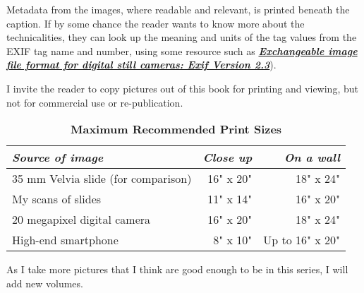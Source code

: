 Metadata from the images, where readable and relevant, is printed beneath the caption. If by some chance the reader wants to know more about the technicalities, they can look up the meaning and units of the tag values from the EXIF tag name and number, using some resource such as \href{https://www.cipa.jp/std/documents/e/DC-008-2012_E.pdf}{\emph{\textbf{Exchangeable image file format for digital still cameras: Exif Version 2.3}}}).

I invite the reader to copy pictures out of this book for printing and viewing, but not for commercial use or re-publication. 

\begin{table}[h]
\centering
\captionsetup{labelformat=empty}
\caption{\textbf{Maximum Recommended Print Sizes}}
\begin{tabular}{lrr}
\hline
\emph{Source of image}                                  & \emph{Close up} & \emph{On a wall} \\
\hline
35 mm Velvia slide (for comparison) & 16" x 20" & 18" x 24" \\
My scans of slides                            & 11" x 14"  & 16" x 20"  \\
20 megapixel digital camera             & 16" x 20"  & 18" x 24"  \\
High-end smartphone                      & 8" x 10"   & Up to 16" x 20"  \\
\hline
\end{tabular}
\end{table}

As I take more pictures that I think are good enough to be in this series, I will add new volumes.
